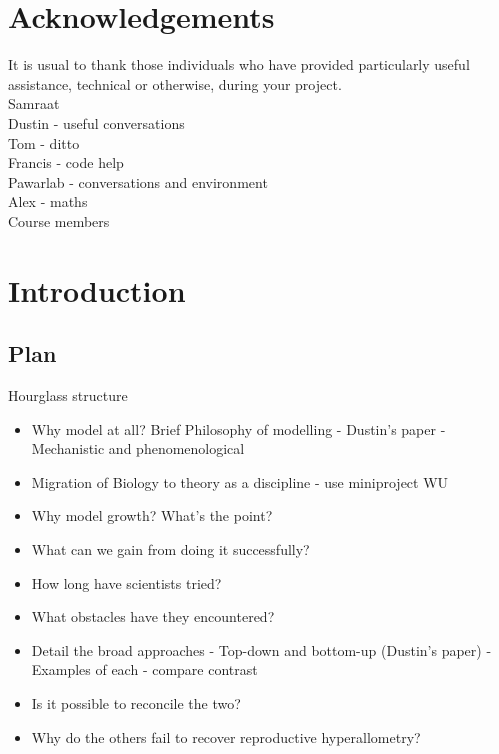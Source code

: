\documentclass[a4paper]{article} %
\begin{document}
\section*{Acknowledgements}\thispagestyle{empty}
    It is usual to thank those individuals who have provided particularly useful assistance, technical or otherwise, during your project. \\
    Samraat \\
    Dustin - useful conversations \\
    Tom - ditto \\
    Francis - code help \\
    Pawarlab - conversations and environment \\
    Alex - maths \\
    Course members \\

\newpage\tableofcontents\thispagestyle{empty}

\newpage\listoffigures\thispagestyle{empty}

\newpage\listoftables\thispagestyle{empty}

\vspace*{250px}
\section{Introduction}\thispagestyle{empty}
    \subsection{Plan}
        Hourglass structure
        \begin{itemize}
            \item Why model at all? Brief Philosophy of modelling - Dustin's paper - Mechanistic and phenomenological
            \item Migration of Biology to theory as a discipline - use miniproject WU
            \item Why model growth? What's the point? 
            \item What can we gain from doing it successfully? 
            \item How long have scientists tried?
            \item What obstacles have they encountered?
            \item Detail the broad approaches - Top-down and bottom-up (Dustin's paper) - Examples of each - compare contrast
            \item Is it possible to reconcile the two?
            \item Why do the others fail to recover reproductive hyperallometry?
        \end{itemize}
    
\end{document}
